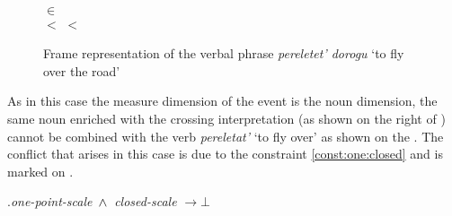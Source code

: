 \begin{figure}
\begin{minipage}{0.66\textwidth}
\end{minipage}%
\begin{minipage}{0.33\textwidth}\centering
{}\\
 $\in$ \\ $<$  $<$ 
\end{minipage}
\caption{Frame representation of the verbal phrase \textit{pereletet' dorogu} `to fly over the road' \label{frame:pere:letet:road}}
\end{figure}

As in this case the measure dimension of the event is the noun dimension, the same noun enriched with the crossing interpretation (as shown on the right of ) cannot be combined with the verb \textit{pereletat'} `to fly over' as shown on the . The conflict that arises in this case is due to the constraint \ref{const:one:closed} and is marked on .

\ex.\label{const:one:closed}\textit{one-point-scale} $\,\wedge\,$ \textit{closed-scale} $\rightarrow \bot$

